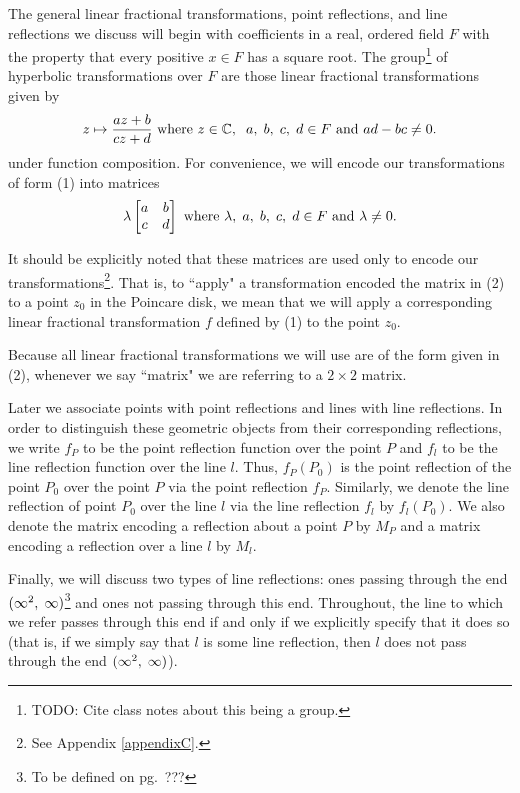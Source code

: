 \documentclass[12pt]{article}
\newcommand{\C}{\mathbb{C}}
\newcommand{\ttc}{, \hspace{1mm}}
\newcommand{\lftmat}[4]{\begin{bmatrix} {#1} & {#2} \\ {#3} & {#4} \end{bmatrix}}
\newcommand{\stanlftmat}{\lftmat{a}{b}{c}{d}}
\newcommand{\specialend}{(\infty^2\ttc\infty)}
\theoremstyle{plain}
\theoremstyle{definition}
\begin{document}
The general linear fractional transformations, point reflections, and line reflections we discuss will begin with coefficients in a real, ordered field $F$ with the property that every positive $x \in F$ has a square root. The group\footnote{TODO: Cite class notes about this being a group.} of hyperbolic transformations over $F$ are those linear fractional transformations given by
\begin{equation} 
	z \mapsto \frac{az+b}{cz+d} \text{ where } z \in \C, \hspace{2mm} a \ttc b \ttc c \ttc d \in F \text{ and } ad-bc \neq 0. 
\end{equation}
under function composition. For convenience, we will encode our transformations of form (1) into matrices
\begin{equation}
	\lambda \stanlftmat \text{ where } \lambda \ttc a \ttc b \ttc c \ttc d \in F \text{ and } \lambda \neq 0. 
\end{equation}

It should be explicitly noted that these matrices are used only to encode our transformations\footnote{See Appendix \ref{appendixC}.}. That is, to ``apply" a transformation encoded the matrix in (2) to a point $z_0$ in the Poincare disk, we mean that we will apply a corresponding linear fractional transformation $f$ defined by (1) to the point $z_0$. 

Because all linear fractional transformations we will use are of the form given in (2), whenever we say ``matrix" we are referring to a $2 \times 2$ matrix. 

Later we associate points with point reflections and lines with line reflections. In order to distinguish these geometric objects from their corresponding reflections, we write $f_P$ to be the point reflection function over the point $P$ and $f_l$ to be the line reflection function over the line $l$. Thus, $f_P(P_0)$ is the point reflection of the point $P_0$ over the point $P$ via the point reflection $f_P$. Similarly, we denote the line reflection of point $P_0$ over the line $l$ via the line reflection $f_l$ by $f_l(P_0)$. We also denote the matrix encoding a reflection about a point $P$ by $M_P$ and a matrix encoding a reflection over a line $l$ by $M_l$. 

Finally, we will discuss two types of line reflections: ones passing through the end $\specialend$\footnote{To be defined on pg.~???} and ones not passing through this end. Throughout, the line to which we refer passes through this end if and only if we explicitly specify that it does so (that is, if we simply say that $l$ is some line reflection, then $l$ does not pass through the end $\specialend$).
\end{document}
